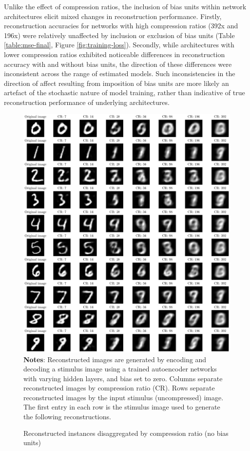 Unlike the effect of compression ratios, the inclusion of bias units within network architectures elicit mixed changes in reconstruction performance.
Firstly, reconstruction accuracies for networks with high compression ratios (392x and 196x) were relatively unaffected by  inclusion or exclusion of bias units (Table \ref{table:mse-final}, Figure \ref{fig:training-loss}).
Secondly, while architectures with lower compression ratios exhibited noticeable differences in reconstruction accuracy with and without bias units, the direction of these differences were inconsistent across the range of estimated models.
Such inconsistencies in the direction of affect resulting from imposition of bias units are more likely an artefact of the stochastic nature of model training, rather than indicative of true reconstruction performance of underlying architectures. 

\begin{figure}
    \caption{Reconstructed instances disaggregated by compression ratio (no bias units)}
	\label{fig:decoded-instances}
	\includegraphics[width=1.0\textwidth]{graphics/decoded_instances.pdf}
    \textbf{Notes}: Reconstructed images are generated by encoding and decoding a stimulus image using a trained autoencoder networks with varying hidden layers, and bias set to zero. Columns separate reconstructed images by compression ratio (CR). Rows separate reconstructed images by the input stimulus (uncompressed) image. The first entry in each row is the stimulus image used to generate the following reconstructions.
\end{figure}

